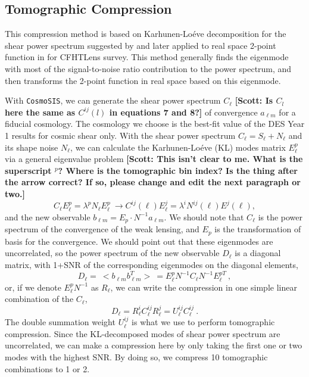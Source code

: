 \documentclass[twocolumn]{\docclass}
\newcommand\be{\begin{equation}}
\newcommand\ee{\end{equation}}
\newcommand\scott[1]{{\bf [Scott: #1]}}
\begin{document}
	\subsection{Tomographic Compression}
	
	This compression method is based on Karhunen-Lo\'eve decomposition for the shear power spectrum suggested by \citep{Alonso:2017hhj} and later applied to real space 2-point function in \citep{Bellini:2019ssw} for CFHTLens survey. This method generally finds the eigenmode with most of the signal-to-noise ratio contribution to the power spectrum, and then transforms the 2-point function in real space based on this eigenmode.
	
	With  {\tt CosmoSIS}, we can generate the shear power spectrum $C_{\ell}$ \scott{Is $C_l$ here the same as $C^{ij}(l)$ in equations 7 and 8?} of convergence $a_{\ell m}$ for a fiducial cosmology. The cosmology we choose is the best-fit value of the DES Year 1 results for cosmic shear only. With the shear power spectrum $C_{\ell}=S_{\ell}+N_{\ell}$ and its shape noise $N_{\ell}$, we can calculate the Karhunen-Lo\'eve (KL) modes matrix $E^p_{\ell}$ via a general eigenvalue problem \scott{This isn't clear to me. What is the superscript $^p$? Where is the tomographic bin index? Is the thing after the arrow correct? If so, please change and edit the next paragraph or two.}
	\be
	C_{\ell} E^p_{\ell} = \lambda ^p N_{\ell} E^p_{\ell}\
	\rightarrow
	C^{ij}(\ell) E^j_{\ell} = \lambda^i N^{ij}(\ell) E^j(\ell)
	,\ee
	and the new observable $b_{\ell m} = E_p \cdot N^{-1} a_{\ell m}$. We should note that $C_{\ell}$ is the power spectrum of the convergence of the weak lensing, and $E_p$ is the transformation of basis for the convergence. We should point out that these eigenmodes are uncorrelated, so the power spectrum of the new observable $D_{\ell}$ is a diagonal matrix, with 1+SNR of the corresponding eigenmodes on the diagonal elements,
	\be
	D_{\ell} =\ <b_{\ell m} b_{\ell m}^T>\ = E^p_{\ell} N^{-1} C_{\ell} N^{-1} E^{pT}_{\ell}\
	,\ee
	or, if we denote $E^p_{\ell} N^{-1}$ as $R_{\ell}$, we can write the compression in one simple linear combination of the $C_{\ell}$,
	\be
	D_{\ell} = R_{\ell}^i C_{\ell}^{ij} R_{\ell}^j = U_{\ell}^{ij} C_{\ell}^{ij}\
	.\ee
	The double summation weight $U_{\ell}^{ij}$ is what we use to perform tomographic compression. Since the KL-decomposed modes of shear power spectrum are uncorrelated, we can make a compression here by only taking the first one or two modes with the highest SNR. By doing so, we compress 10 tomographic combinations to 1 or 2.
	
\end{document}
